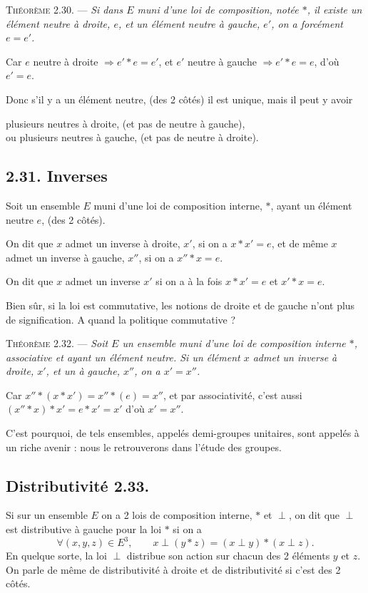 \medskip\noindent\textsc{Théorème 2.30.} --- \emph{Si dans $E$ muni d'une loi de composition, notée $*$, il existe un élément neutre à droite, $e$, et un élément neutre à gauche, $e'$, on a forcément $e=e'$.}

Car $e$ neutre à droite $\Rightarrow e'*e=e'$, et $e'$ neutre à gauche $\Rightarrow e'*e=e$, d'où $e'=e$. \bookend

Donc s'il y a un élément neutre, (des 2 côtés) il est unique, mais il peut y avoir
\begin{center}
plusieurs neutres à droite, (et pas de neutre à gauche),\\
ou plusieurs neutres à gauche, (et pas de neutre à droite).
\end{center}

\subsection*{2.31. Inverses}

Soit un ensemble $E$ muni d'une loi de composition interne, $*$, ayant un élément neutre $e$, (des 2 côtés).

On dit que $x$ admet un inverse à droite, $x'$, si on a $x*x'=e$, et de même $x$ admet un inverse à gauche, $x''$, si on a $x''*x=e$.

On dit que $x$ admet un inverse $x'$ si on a à la fois $x*x'=e$ et $x'*x=e$.

Bien sûr, si la loi est commutative, les notions de droite et de gauche n'ont plus de signification. A quand la politique commutative ?

\medskip\noindent\textsc{Théorème 2.32.} --- \emph{Soit $E$ un ensemble muni d'une loi de composition interne $*$, associative et ayant un élément neutre. Si un élément $x$ admet un inverse à droite, $x'$, et un à gauche, $x''$, on a $x'=x''$.}

Car $x''*(x*x')=x''*(e)=x''$, et par associativité, c'est aussi $(x''*x)*x'=e*x'=x'$ d'où $x'=x''$. \bookend

C'est pourquoi, de tels ensembles, appelés demi-groupes unitaires, sont appelés à un riche avenir : nous le retrouverons dans l'étude des groupes.

\subsection*{Distributivité 2.33.}
Si sur un ensemble $E$ on a 2 lois de composition interne, $*$ et $\perp$, on dit que $\perp$ est distributive à gauche pour la loi $*$ si on a
\[
\forall(x,y,z)\in E^3,\qquad x\perp(y*z)=(x\perp y)*(x\perp z).
\]
En quelque sorte, la loi $\perp$ distribue son action sur chacun des 2 éléments $y$ et $z$. On parle de même de distributivité à droite et de distributivité si c'est des 2 côtés.

